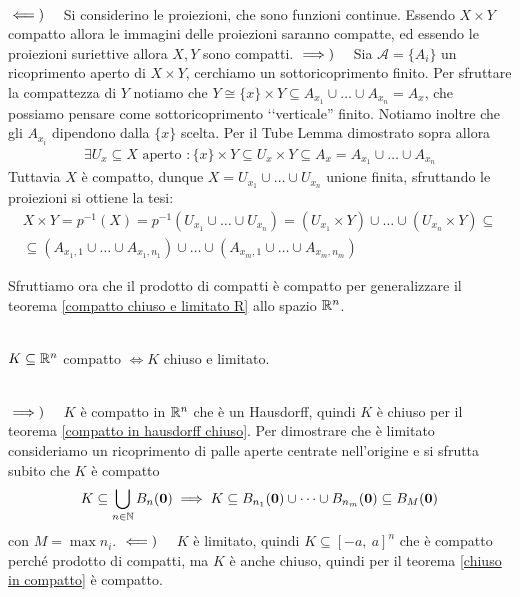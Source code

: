 \begin{demonstration}~{}\\
	$\impliedby)\quad $ Si considerino le proiezioni, che sono funzioni continue. Essendo $X\times Y$ compatto allora le immagini delle proiezioni saranno compatte, ed essendo le proiezioni suriettive allora $X,Y$ sono compatti. \newline
	$\implies)\quad $ Sia $\mathcal{A}=\{A_i\}$ un ricoprimento aperto di $X\times Y$, cerchiamo un sottoricoprimento finito.\newline
	Per sfruttare la compattezza di $Y$ notiamo che $Y\cong \{x\}\times Y\subseteq A_{x_1}\cup\dots\cup A_{x_n}=A_x$, che possiamo pensare come sottoricoprimento ‘‘verticale'' finito. Notiamo inoltre che gli $A_{x_i}$ dipendono dalla $\{x\}$ scelta.\newline
	Per il Tube Lemma dimostrato sopra allora
		\begin{gather*}
			\exists U_x\subseteq X \text{ aperto }\colon \{ x\}\times Y \subseteq U_x\times Y \subseteq A_x=A_{x_1}\cup\dots\cup A_{x_n}
		\end{gather*}
	Tuttavia $X$ è compatto, dunque $X=U_{x_1}\cup\dots\cup U_{x_n}$ unione finita, sfruttando le proiezioni si ottiene la tesi:
		\begin{gather*}
			X\times Y =p^{-1}(X)=p^{-1}\left( U_{x_1}\cup\dots\cup U_{x_n}\right)= (U_{x_1}\times Y)\cup\dots\cup (U_{x_n}\times Y)\subseteq \\
			\subseteq \left( A_{x_1 , 1}\cup\dots\cup A_{x_1, n_1}\right) \cup\dots\cup \left( A_{x_m, 1}\cup\dots\cup A_{x_m, n_m} \right)
		\end{gather*}
\end{demonstration}
Sfruttiamo ora che il prodotto di compatti è compatto per generalizzare il teorema \ref{compatto chiuso e limitato R} allo spazio $\mathbb{R} ^n$.
\begin{theorema}~{}\label{compatto chiuso e limitato R^n}\\
$K\subseteq \mathbb{R}^n$ compatto $\iff K$ chiuso e limitato.
\end{theorema}
\begin{demonstration}~{}\\
	$\implies)\quad$ $K$ è compatto in $\mathbb{R}^n$ che è un Hausdorff, quindi $K$ è chiuso per il teorema \ref{compatto in hausdorff chiuso}. Per dimostrare che è limitato  consideriamo un ricoprimento di palle aperte centrate nell'origine e si sfrutta subito che $K$ è compatto
		\begin{gather*}
			K\subseteq \mathop{{\bigcup}}\displaylimits_{n\in\mathbb{N}} B_n(\mathbf{0}) \implies K\subseteq B_{n_1}(\mathbf{0})\cup\dots\cup B_{n_m}(\mathbf{0}) \subseteq B_M (\mathbf{0})
		\end{gather*}
	con $M=\max n_i$.\newline
	$\impliedby)\quad$ $K$ è limitato, quindi $K\subseteq [-a,\ a]^n$ che è compatto perché prodotto di compatti, ma $K$ è anche chiuso, quindi per il teorema \ref{chiuso in compatto} è compatto.
\end{demonstration}
